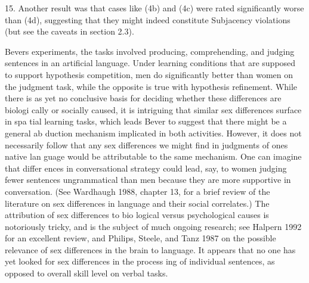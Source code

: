 \begin{styleStandard}
15. Another result was that cases like (4b) and (4c) were rated significantly worse than (4d), suggesting that they might indeed constitute Subjacency violations (but see the caveats in section 2.3).
\end{styleStandard}


\clearpage\setcounter{page}{1}\begin{styleTextbody}
Bever{\textquotesingle}s experiments, the tasks involved producing, comprehending, and judging sentences in an artificial language. Under learning conditions that are supposed to support hypothesis competition, men do significantly better than women on the judgment task, while the opposite is true with hypothesis refinement. While there is as yet no conclusive basis for deciding whether these differences are biologi\- cally or socially caused, it is intriguing that similar sex differences surface in spa\- tial learning tasks, which leads Bever to suggest that there might be a general ab\- duction mechanism implicated in both activities. However, it does not necessarily follow that any sex differences we might find in judgments of one{\textquotesingle}s native lan\- guage would be attributable to the same mechanism. One can imagine that differ\- ences in conversational strategy could lead, say, to women judging fewer sentences ungrammatical than men because they are more supportive in conversation. (See Wardhaugh 1988, chapter 13, for a brief review of the literature on sex differences in language and their social correlates.) The attribution of sex differences to bio\- logical versus psychological causes is notoriously tricky, and is the subject of much ongoing research; see Halpern 1992 for an excellent review, and Philips, Steele, and Tanz 1987 on the possible relevance of sex differences in the brain to language. It appears that no one has yet looked for sex differences in the process\- ing of individual sentences, as opposed to overall skill level on verbal tasks.
\end{styleTextbody}


